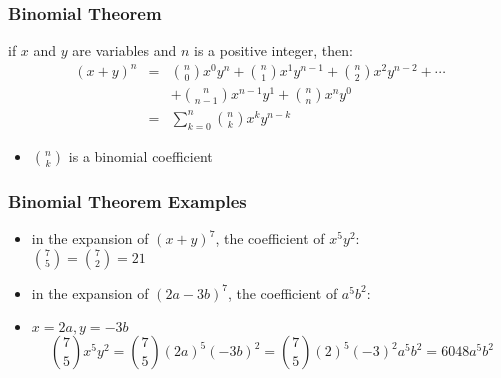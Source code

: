\documentclass[dvipsnames]{beamer}
\begin{document}
\begin{frame}
  \frametitle{Binomial Theorem}

  \begin{theorem}
    if $x$ and $y$ are variables and $n$ is a positive integer, then:
    \begin{eqnarray*}
      (x+y)^n & = & {n\choose 0} x^0 y^n
                    + {n\choose 1} x^1 y^{n-1}
                    + {n\choose 2} x^2 y^{n-2} + \cdots\\
              &   & + {n\choose n-1} x^{n-1} y^1
                    + {n\choose n} x^n y^0 \\
              & = & \sum^n_{k=0}{{n\choose k} x^k y^{n-k}}
    \end{eqnarray*}
  \end{theorem}

  \pause
  \begin{itemize}
    \item ${n\choose k}$ is a \alert{binomial coefficient}
  \end{itemize}
\end{frame}

\begin{frame}
  \frametitle{Binomial Theorem Examples}

  \begin{example}
    \begin{itemize}
      \item in the expansion of $(x+y)^7$, the coefficient of $x^5 y^2$:\\
        ${7\choose 5} = {7 \choose 2} = 21$
    \end{itemize}
  \end{example}

  \pause
  \begin{example}
    \begin{itemize}
      \item in the expansion of $(2a-3b)^7$, the coefficient of $a^5 b^2$:
      \item $x=2a, y=-3b$
      \begin{equation*}
      {7\choose 5} x^5 y^2 = {7\choose 5} (2a)^5 (-3b)^2
                           = {7\choose 5} (2)^5 (-3)^2 a^5 b^2 = 6048 a^5 b^2
      \end{equation*}
    \end{itemize}
  \end{example}  
\end{frame}
\end{document}
